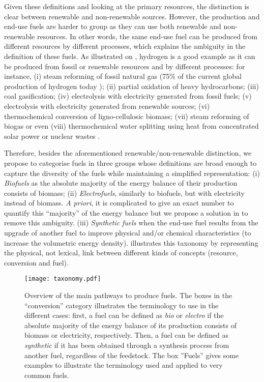 
Given these definitions and looking at the primary resources, the distinction is clear between renewable and non-renewable sources. However, the production and end-use fuels are harder to group as they can use both renewable and non-renewable resources. In other words, the same end-use fuel can be produced from different resources by different processes, which explains the ambiguity in the definition of these fuels. As illustrated on , hydrogen is a good example as it can be produced from fossil or renewable resources and by different processes: for instance, (i) steam reforming of fossil natural gas (75\% of the current global production of hydrogen today \cite{iea2019hydrogen}); (ii) partial oxidation of heavy hydrocarbons; (iii) coal gasification; (iv) electrolysis with electricity generated from fossil fuels; (v) electrolysis with electricity generated from renewable sources; (vi) thermochemical conversion of ligno-cellulosic biomass; (vii) steam reforming of biogas or even (viii) thermochemical water splitting using heat from concentrated solar power or nuclear wastes \cite{acar2014}. 

Therefore, besides the aforementioned renewable/non-renewable distinction, we propose to categorise fuels in three groups whose definitions are broad enough to capture the diversity of the fuels while maintaining a simplified representation: (i) \textit{Biofuels} as the absolute majority of the energy balance of their production consists of biomass; (ii) \textit{Electrofuels}, similarly to biofuels, but with electricity instead of biomass. \textit{A priori}, it is complicated to give an exact number to quantify this ``majority'' of the energy balance but we propose a solution in  to remove this ambiguity. (iii) \textit{Synthetic fuels} when the end-use fuel results from the upgrade of another fuel to improve physical and/or chemical characteristics (\eg to increase the volumetric energy density).  illustrates this taxonomy by representing the physical, not lexical, link between different kinds of concepts (\eg resource, conversion and fuel).

\begin{figure}[htbp]
    \centering
    \texttt{[image: taxonomy.pdf]}
    \caption{Overview of the main pathways to produce fuels. The boxes in the ``conversion'' category illustrates the terminology to use in the different cases: first, a fuel can be defined as \emph{bio} or \emph{electro} if the absolute majority of the energy balance of its production consists of biomass or electricity, respectively. Then, a fuel can be defined as \emph{synthetic} if it has been obtained through a synthesis process from another fuel, regardless of the feedstock. The box ''Fuels'' gives some examples to illustrate the terminology used and applied to very common fuels.}
    \label{fig:synfuels_paths}
\end{figure}

